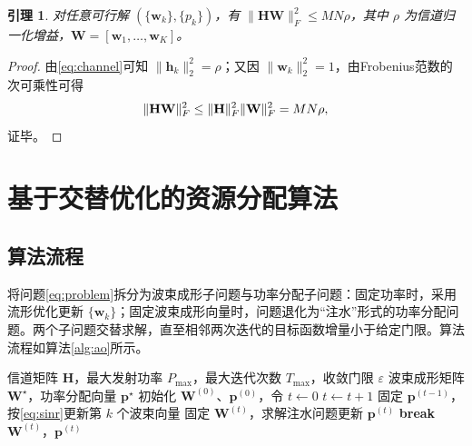 \documentclass[UTF8, a4paper, zihao=-4, fontset=windows]{ctexart}
\theoremstyle{plain}
\newtheorem{lemma}{引理}
\theoremstyle{definition}
\theoremstyle{plain}
\begin{document}
\begin{lemma}\label{lem:bound}
对任意可行解 $\left(\{\mathbf{w}_k\},\{p_k\}\right)$，有 $\|\mathbf{H}\mathbf{W}\|_F^2\le MN\rho$，其中 $\rho$ 为信道归一化增益，$\mathbf{W}=[\mathbf{w}_1,\ldots,\mathbf{w}_K]$。
\end{lemma}

\begin{proof}
由\eqref{eq:channel}可知 $\|\mathbf{h}_k\|_2^2=\rho$；又因 $\|\mathbf{w}_k\|_2^2=1$，由Frobenius范数的次可乘性可得
\begin{equation}
\|\mathbf{H}\mathbf{W}\|_F^2\le\|\mathbf{H}\|_F^2\|\mathbf{W}\|_F^2=MN\rho,
\notag
\end{equation}
证毕。
\end{proof}

\section{基于交替优化的资源分配算法}\label{sec:algo}

\subsection{算法流程}\label{sec:flow}

将问题\eqref{eq:problem}拆分为波束成形子问题与功率分配子问题：固定功率时，采用流形优化更新 $\{\mathbf{w}_k\}$；固定波束成形向量时，问题退化为“注水”形式的功率分配问题。两个子问题交替求解，直至相邻两次迭代的目标函数增量小于给定门限。算法流程如算法\ref{alg:ao}所示。

\begin{algorithm}[htbp]
\caption{基于交替优化的联合资源分配算法}\label{alg:ao}
\begin{algorithmic}[1]
\Require 信道矩阵 $\mathbf{H}$，最大发射功率 $P_{\max}$，最大迭代次数 $T_{\max}$，收敛门限 $\varepsilon$
\Ensure 波束成形矩阵 $\mathbf{W}^{\star}$，功率分配向量 $\mathbf{p}^{\star}$
\State 初始化 $\mathbf{W}^{(0)}$、$\mathbf{p}^{(0)}$，令 $t\leftarrow 0$
  \State $t\leftarrow t+1$
    \State 固定 $\mathbf{p}^{(t-1)}$，按\eqref{eq:sinr}更新第 $k$ 个波束向量 
  \EndFor
  \State 固定 $\mathbf{W}^{(t)}$，求解注水问题更新 $\mathbf{p}^{(t)}$ 
    \State \textbf{break} 
  \EndIf
\EndWhile
\State \Return $\mathbf{W}^{(t)}$，$\mathbf{p}^{(t)}$
\end{algorithmic}
\end{algorithm}
\end{document}
